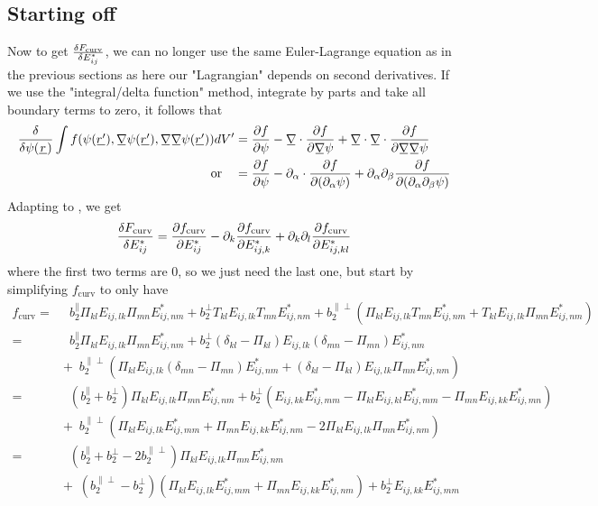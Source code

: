 \documentclass[11pt]{article}
\begin{document}
\subsection{Starting off}
Now to get $\fdv{F_\text{curv}}{E_{ij}^*}$, we can no longer use the same Euler-Lagrange equation as in the previous sections as here our "Lagrangian" depends on second derivatives.
If we use the "integral/delta function" method, integrate by parts and take all boundary terms to zero, it follows that
\begin{align}
    \fdv{\psi(\su{r})}\int f(\psi(\su{r'}), \mgrad \psi(\su{r'}), \mgrad \mgrad \psi(\su{r'})) dV' &= \pdv{f}{\psi} - \mgrad \cdot \pdv{f}{\mgrad \psi} + \mgrad \cdot \mgrad \cdot \pdv{f}{\mgrad \mgrad \psi} \\
    \qq{or} &= \pdv{f}{\psi} - \pp_\alpha \cdot \pdv{f}{(\pp_\alpha \psi)} + \pp_\alpha \pp_\beta \pdv{f}{(\pp_\alpha \pp_\beta \psi)} \\
\end{align}
Adapting to \EE, we get
\begin{equation}
    \fdv{F_\text{curv}}{E_{ij}^*} = \pdv{f_\text{curv}}{E_{ij}^*} - \pp_k \pdv{f_\text{curv}}{E_{ij,k}^*} + \pp_k \pp_l \pdv{f_\text{curv}}{E_{ij,kl}^*}
\end{equation}
where the first two terms are 0, so we just need the last one, but start by simplifying $f_\text{curv}$ to only have \PP
\begin{align}
    f_\text{curv} =&\enspace b_2^\parallel \Pi_{kl}E_{ij,lk}\Pi_{mn}E_{ij,nm}^* + b_2^\perp T_{kl}E_{ij,lk}T_{mn}E_{ij,nm}^* + b_2^{\parallel\perp}(\Pi_{kl}E_{ij,lk}T_{mn}E_{ij,nm}^* + T_{kl}E_{ij,lk}\Pi_{mn}E_{ij,nm}^*) \\
    =&\enspace b_2^\parallel \Pi_{kl}E_{ij,lk}\Pi_{mn}E_{ij,nm}^* + b_2^\perp (\delta_{kl} - \Pi_{kl})E_{ij,lk}(\delta_{mn} - \Pi_{mn})E_{ij,nm}^* \\
    &+\enspace b_2^{\parallel\perp}(\Pi_{kl}E_{ij,lk}(\delta_{mn} - \Pi_{mn})E_{ij,nm}^* + (\delta_{kl} - \Pi_{kl})E_{ij,lk}\Pi_{mn}E_{ij,nm}^*) \nonumber \\
    =&\enspace (b_2^\parallel + b_2^\perp) \Pi_{kl}E_{ij,lk}\Pi_{mn}E_{ij,nm}^* + b_2^\perp (E_{ij,kk}E_{ij,mm}^* - \Pi_{kl}E_{ij,kl}E_{ij,mm}^* - \Pi_{mn}E_{ij,kk}E_{ij,mn}^*)\\
    &+\enspace b_2^{\parallel\perp}(\Pi_{kl}E_{ij,lk}E_{ij,mm}^* + \Pi_{mn}E_{ij,kk}E_{ij,nm}^* - 2\Pi_{kl}E_{ij,lk}\Pi_{mn}E_{ij,nm}^*) \nonumber \\
    =&\enspace (b_2^\parallel + b_2^\perp - 2b_2^{\parallel\perp}) \Pi_{kl}E_{ij,lk}\Pi_{mn}E_{ij,nm}^* \label{eq:fcurv}\\
    &+\enspace (b_2^{\parallel\perp} - b_2^\perp)(\Pi_{kl}E_{ij,lk}E_{ij,mm}^* + \Pi_{mn}E_{ij,kk}E_{ij,nm}^*) + b_2^\perp E_{ij,kk}E_{ij,mm}^* \nonumber
\end{align}
\end{document}
